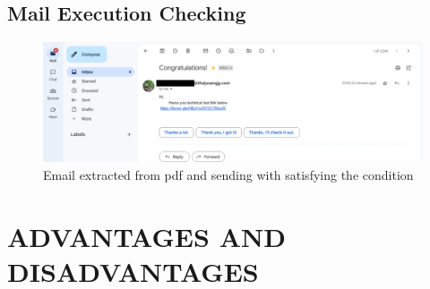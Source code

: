 \documentclass[12 pt, oneside]{book}
\begin{document}

\newpage
\section{Mail Execution Checking}
\begin{figure}[h]
 \begin{center}
		\includegraphics[width = 14 cm]{Emailsend.jpg}
		\caption{Email extracted from pdf and sending with satisfying the condition}
		\label{ab}	\end{center}
\end{figure}
	    
	
	    
	



\chapter{ADVANTAGES AND DISADVANTAGES}
\end{document}
